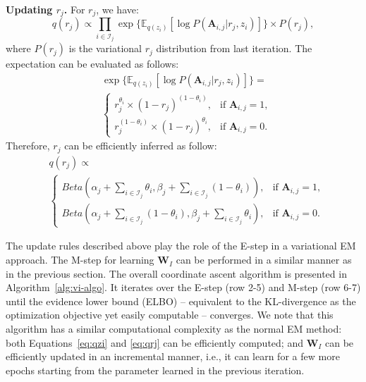 \smallskip
\noindent\textbf{Updating $r_j$.}  For $r_j$, we have:
%
\begin{equation}
    q(r_j) \propto \prod_{i \in \mathcal{I}_j} \exp{\{\mathbb{E}_{q(z_i)}[\log{P(\mathbf{A}_{i,j}|r_j,z_i)}]\}} \times   {P(r_j)},
\end{equation}
%
where $P(r_j)$ is the variational $r_j$ distribution from last iteration. The expectation can be evaluated as follows:
%
\begin{align}  
& \exp{\{\mathbb{E}_{q(z_i)}[\log{P(\mathbf{A}_{i,j}|r_j,z_i)}]\}} = \nonumber \\
& 
\left\{  
    \begin{array}{lr}
        r_j^{\theta_i}  \times (1-r_j)^{(1 - \theta_i)}, &  \text{if\ } \mathbf{A}_{i,j}=1,\\  
        r_j^{(1 - \theta_i)}  \times (1-r_j)^{\theta_i}, &  \text{if\ } \mathbf{A}_{i,j}=0.   
    \end{array}  
\right. 
\end{align}
%
Therefore, $r_j$ can be efficiently inferred as follow:
%
\begin{align}  
& q(r_j)  \propto \nonumber \\
& 
\left\{  
    \begin{array}{lr}
        Beta(\alpha_j+\sum_{i\in \mathcal{I}_j}  \theta_i,\beta_j+ \sum_{i\in \mathcal{I}_j} (1 - \theta_i) ), &  \text{if\ } \mathbf{A}_{i,j}=1,\\  
        Beta(\alpha_j+\sum_{i\in \mathcal{I}_j} (1 - \theta_i),\beta_j+ \sum_{i\in \mathcal{I}_j} \theta_i), &  \text{if\ } \mathbf{A}_{i,j}=0.   
    \end{array}  
\right. 
\label{eq:qrj}
\end{align}



The update rules described above play the role of the E-step in a variational EM approach. 
The M-step for learning $\mathbf{W}_I$ can be performed in a similar manner as in the previous section. The overall coordinate ascent algorithm is presented in Algorithm~\ref{alg:vi-algo}. It iterates over the E-step (row 2-5) and M-step (row 6-7) until the evidence lower bound (ELBO) \cite{blei2017variational} -- equivalent to the KL-divergence as the optimization objective yet easily computable -- converges. We note that this algorithm has a similar computational complexity as the normal EM method: both Equations~\ref{eq:qzi} and \ref{eq:qrj} can be efficiently computed; and $\mathbf{W}_I$ can be efficiently updated in an incremental manner, i.e., it can learn for a few more epochs starting from the parameter learned in the previous iteration.

